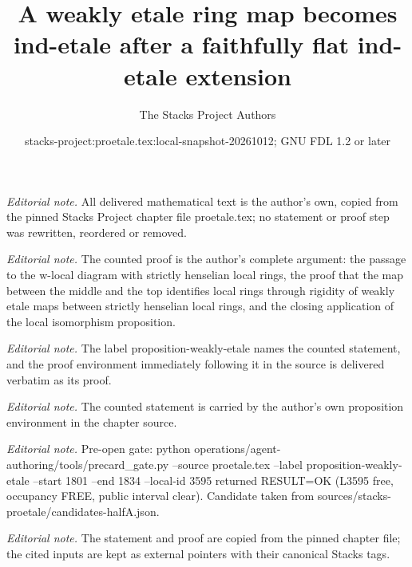 \documentclass[10pt,a4paper]{amsart}
\title{A weakly etale ring map becomes ind-etale after a faithfully flat ind-etale extension}
\author{The Stacks Project Authors}
\date{stacks-project:proetale.tex:local-snapshot-20261012; GNU FDL 1.2 or later}
\theoremstyle{plain}
\theoremstyle{definition}
\theoremstyle{remark}
\numberwithin{equation}{subsection}
\begin{document}
\maketitle
\noindent\textit{Editorial note.} All delivered mathematical text is the author's own, copied from the pinned Stacks Project chapter file proetale.tex; no statement or proof step was rewritten, reordered or removed.\par\medskip
\noindent\textit{Editorial note.} The counted proof is the author's complete argument: the passage to the w-local diagram with strictly henselian local rings, the proof that the map between the middle and the top identifies local rings through rigidity of weakly etale maps between strictly henselian local rings, and the closing application of the local isomorphism proposition.\par\medskip
\noindent\textit{Editorial note.} The label proposition-weakly-etale names the counted statement, and the proof environment immediately following it in the source is delivered verbatim as its proof.\par\medskip
\noindent\textit{Editorial note.} The counted statement is carried by the author's own proposition environment in the chapter source.\par\medskip
\noindent\textit{Editorial note.} Pre-open gate: python operations/agent-authoring/tools/precard\_gate.py --source proetale.tex --label proposition-weakly-etale --start 1801 --end 1834 --local-id 3595 returned RESULT=OK (L3595 free, occupancy FREE, public interval clear). Candidate taken from sources/stacks-proetale/candidates-halfA.json.\par\medskip
\noindent\textit{Editorial note.} The statement and proof are copied from the pinned chapter file; the cited inputs are kept as external pointers with their canonical Stacks tags.\par\medskip
\end{document}
